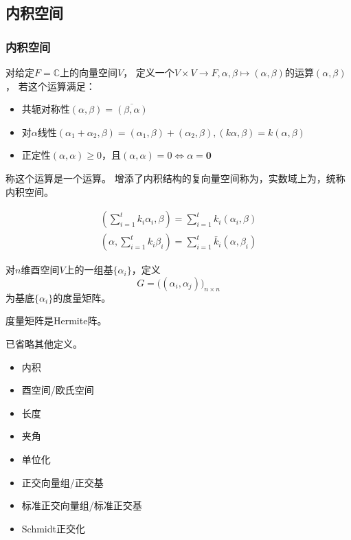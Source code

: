 \subsection{内积空间}

\subsubsection{内积空间}

\begin{definition}[内积空间]
    对给定$F=\mathbb{C}$上的向量空间$V$，
    定义一个$V\times V\to F, \alpha,\beta\mapsto (\alpha,\beta)$的运算$(\alpha,\beta)$，
    若这个运算满足：
    \begin{itemize}
        \item 共轭对称性$(\alpha,\beta)=\overline{(\beta,\alpha)}$
        \item 对$\alpha$线性$(\alpha_1+\alpha_2, \beta)=(\alpha_1,\beta)+(\alpha_2,\beta),(k\alpha,\beta)=k(\alpha,\beta)$
        \item 正定性$(\alpha,\alpha)\geq 0$，且$(\alpha,\alpha)=0\Leftrightarrow \alpha=\bm{0}$
    \end{itemize}
    称这个运算是一个运算。
    增添了内积结构的复向量空间称为，实数域上为，统称内积空间。
\end{definition}

\begin{property}
    \begin{gather*}
        \left(\sum_{i=1}^{t} k_{i} \alpha_{i}, \beta\right) =\sum_{i=1}^{t} k_{i}\left(\alpha_{i}, \beta\right) \\
        \left(\alpha, \sum_{i=1}^{t} k_{i} \beta_{i}\right) =\sum_{i=1}^{t} \bar{k}_{i}\left(\alpha, \beta_{i}\right)
    \end{gather*}
\end{property}

\begin{definition}[度量矩阵]
    对$n$维酉空间$V$上的一组基$\{\alpha_i\}$，定义
    \[
        G=\Big((\alpha_i, \alpha_j)\Big)_{n\times n}
    \]
    为基底$\{\alpha_i\}$的度量矩阵。
\end{definition}

\begin{property}
    度量矩阵是Hermite阵。
\end{property}

已省略其他定义。
\begin{itemize}
    \item 内积
    \item 酉空间/欧氏空间
    \item 长度
    \item 夹角
    \item 单位化
    \item 正交向量组/正交基
    \item 标准正交向量组/标准正交基
    \item Schmidt正交化
\end{itemize}

